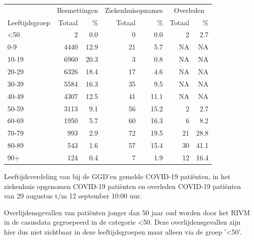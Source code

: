 \documentclass[
  english,
  man,floatsintext]{apa6}
\begin{document}
\begin{table}
\centering\begingroup\fontsize{11}{13}\selectfont

\begin{threeparttable}
\begin{tabular}{lrrrrrr}
\toprule
\multicolumn{1}{c}{ } & \multicolumn{2}{c}{Besmettingen} & \multicolumn{2}{c}{Ziekenhuisopnames} & \multicolumn{2}{c}{Overleden} \\
\cmidrule(l{3pt}r{3pt}){2-3} \cmidrule(l{3pt}r{3pt}){4-5} \cmidrule(l{3pt}r{3pt}){6-7}
Leeftijdsgroep & Totaal & \% & Totaal & \% & Totaal & \%\\
\midrule
<50 & 2 & 0.0 & 0 & 0.0 & 2 & 2.7\\
0-9 & 4440 & 12.9 & 21 & 5.7 & NA & NA\\
10-19 & 6960 & 20.3 & 3 & 0.8 & NA & NA\\
20-29 & 6326 & 18.4 & 17 & 4.6 & NA & NA\\
30-39 & 5584 & 16.3 & 35 & 9.5 & NA & NA\\
40-49 & 4307 & 12.5 & 41 & 11.1 & NA & NA\\
50-59 & 3113 & 9.1 & 56 & 15.2 & 2 & 2.7\\
60-69 & 1950 & 5.7 & 60 & 16.3 & 6 & 8.2\\
70-79 & 993 & 2.9 & 72 & 19.5 & 21 & 28.8\\
80-89 & 543 & 1.6 & 57 & 15.4 & 30 & 41.1\\
90+ & 124 & 0.4 & 7 & 1.9 & 12 & 16.4\\
\bottomrule
\end{tabular}
\begin{tablenotes}
\item[1] Leeftijdsverdeling van bij de GGD’en gemelde COVID-19 patiënten, in het ziekenhuis opgenomen COVID-19 patiënten en overleden COVID-19 patiënten van 29 augustus t/m 12 september 10:00 uur.
\item[2] Overlijdensgevallen van patiënten jonger dan 50 jaar oud worden door het RIVM in de casusdata gegroepeerd in de categorie <50. Deze overlijdensgevallen zijn hier dus niet zichtbaar in deze leeftijdsgroepen maar alleen via de groep '<50'.
\end{tablenotes}
\end{threeparttable}
\endgroup{}
\end{table}

\newpage
\end{document}
